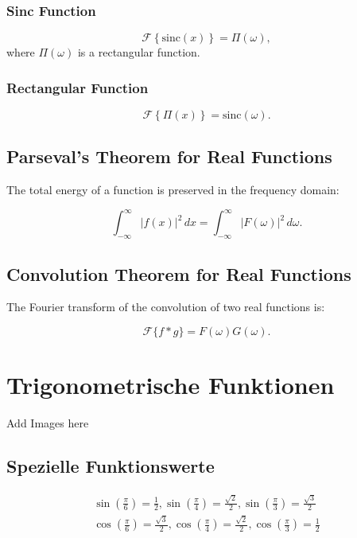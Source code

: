 \documentclass[../Main.tex]{subfiles}
\begin{document}
\subsubsection{Sinc Function}
\begin{equation}
\mathcal{F} \left\{ \text{sinc}(x) \right\} = \Pi(\omega),
\end{equation}
where \( \Pi(\omega) \) is a rectangular function.

\subsubsection{Rectangular Function}
\begin{equation}
\mathcal{F} \left\{ \Pi(x) \right\} = \text{sinc}(\omega).
\end{equation}

\subsection{Parseval's Theorem for Real Functions}

The total energy of a function is preserved in the frequency domain:

\begin{equation}
\int_{-\infty}^{\infty} |f(x)|^2 \, dx = \int_{-\infty}^{\infty} |F(\omega)|^2 \, d\omega.
\end{equation}

\subsection{Convolution Theorem for Real Functions}

The Fourier transform of the convolution of two real functions is:

\begin{equation}
\mathcal{F} \{ f * g \} = F(\omega) G(\omega).
\end{equation}

\section{Trigonometrische Funktionen}
Add Images here
\subsection{Spezielle Funktionswerte}
\begin{equation}
    \begin{aligned}
        \sin(\frac{\pi}{6}) = \frac{1}{2},
        \sin(\frac{\pi}{4}) = \frac{\sqrt{2}}{2},
        \sin(\frac{\pi}{3}) = \frac{\sqrt{3}}{2} \\
        \cos(\frac{\pi}{6}) = \frac{\sqrt{3}}{2},
        \cos(\frac{\pi}{4}) = \frac{\sqrt{2}}{2},
        \cos(\frac{\pi}{3}) = \frac{1}{2}
    \end{aligned}
\end{equation}
\end{document}
